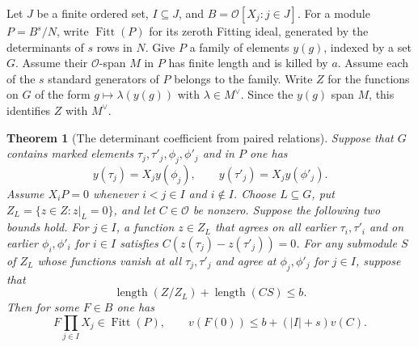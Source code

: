 \documentclass[a4paper,11pt]{article}
\newtheorem{theorem}[proposition]{Theorem}
\theoremstyle{definition}
\theoremstyle{remark}
\newcommand{\len}{\operatorname{length}}\newcommand{\Res}{\operatorname*{Res}}
\numberwithin{equation}{section}
\begin{document}
Let \(J\) be a finite ordered set, \(I\subseteq J\), and
\(B=\mathcal O[X_j:j\in J]\). For a module \(P=B^s/N\), write
\(\operatorname{Fitt}(P)\) for its zeroth Fitting ideal, generated
by the determinants of \(s\) rows in \(N\). Give \(P\) a family
of elements \(y(g)\), indexed by a set \(G\). Assume their
\(\mathcal O\)-span \(M\) in \(P\) has finite length and is killed
by \(a\). Assume each of the \(s\) standard generators of \(P\)
belongs to the family. Write \(Z\) for the functions on \(G\)
of the form \(g\mapsto\lambda(y(g))\) with \(\lambda\in M^\vee\).
Since the \(y(g)\) span \(M\), this identifies \(Z\) with \(M^\vee\).

\begin{theorem}[The determinant coefficient from paired relations]
\leavevmode\label{thm:fittingcost718}
Suppose that \(G\) contains marked elements \(\tau_j,\tau'_j,
\phi_j,\phi'_j\) and in \(P\) one has
\[
       y(\tau_j)=X_jy(\phi_j),\qquad
       y(\tau'_j)=X_jy(\phi'_j).
\]
Assume \(X_i P=0\) whenever \(i<j\in I\) and \(i\notin I\).
Choose \(L\subseteq G\), put \(Z_L=\{z\in Z:z|_L=0\}\), and
let \(C\in\mathcal O\) be nonzero. Suppose the following two
bounds hold. For \(j\in I\), a function \(z\in Z_L\) that agrees
on all earlier \(\tau_i,\tau'_i\) and on earlier
\(\phi_i,\phi'_i\) for \(i\in I\) satisfies
\(C(z(\tau_j)-z(\tau'_j))=0\). For any submodule \(S\) of
\(Z_L\) whose functions vanish at all \(\tau_j,\tau'_j\) and
agree at \(\phi_j,\phi'_j\) for \(j\in I\), suppose that
\[
                  \len(Z/Z_L)+\len(CS)\le b .
\]
Then for some \(F\in B\) one has
\[
       F\prod_{j\in I}X_j\in\operatorname{Fitt}(P),\qquad
       v(F(0))\le b+(|I|+s)v(C).
\]
\end{theorem}
\end{document}
